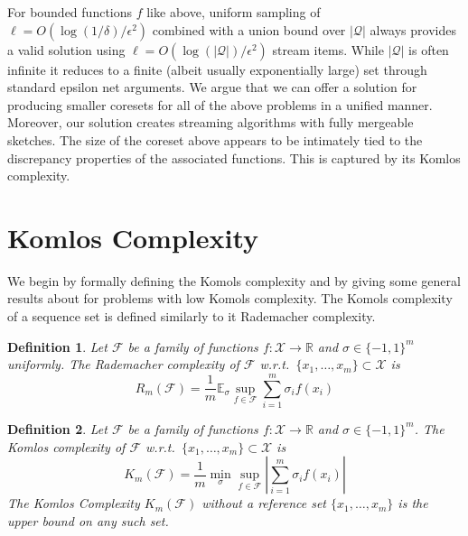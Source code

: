 \documentclass{article} %
\newcommand{\R}{\mathbb{R}}
\newcommand{\E}{\mathbb{E}}
\newcommand{\eps}{\epsilon}
\newcommand{\F}{\mathcal{F}}
\newcommand{\X}{\mathcal{X}}
\newtheorem{definition}{Definition}
\begin{document}
For bounded functions $f$ like above, uniform sampling of $\ell = O(\log(1/\delta)/\eps^2)$ combined with a union bound over $|\mathcal Q|$ always provides a valid solution using $\ell = O(\log(|\mathcal Q|)/\eps^2)$ stream items. 
While $|\mathcal Q|$ is often infinite it reduces to a finite (albeit usually exponentially large) set through standard epsilon net arguments. 
We argue that we can offer a solution for producing smaller coresets for all of the above problems in a unified manner. 
Moreover, our solution creates streaming algorithms with fully mergeable sketches. 
The size of the coreset above appears to be intimately tied to the discrepancy properties of the associated functions.
This is captured by its Komlos complexity.  


\section{Komlos Complexity}
We begin by formally defining the Komols complexity and by giving some general results about for problems with low Komols complexity. The Komols complexity of a sequence set is defined similarly to it Rademacher complexity.
%

\begin{definition}
Let $\F$ be a family of functions $f:\X\rightarrow\R$ and $\sigma \in \{-1,1\}^m$ uniformly. 
The Rademacher complexity of $\F$ w.r.t.\ $\{x_1,\ldots,x_m\} \subset \X$ is 
\[
R_m(\F) =  \frac{1}{m}\E_{\sigma} \sup_{f \in \F}  \sum_{i=1}^{m}\sigma_i f(x_i)
\]
\end{definition}
%
\begin{definition}
Let $\F$ be a family of functions $f:\X\rightarrow\R$ and $\sigma \in \{-1,1\}^m$. 
The Komlos complexity of $\F$ w.r.t.\ $\{x_1,\ldots,x_m\} \subset \X$ is 
\[
K_m(\F) =  \frac{1}{m}\min_{\sigma} \sup_{f \in \F}  \left|\sum_{i=1}^{m}\sigma_i f(x_i)\right|
\]
The Komlos Complexity $K_m(\F)$ without a reference set $\{x_1,\ldots,x_m\}$ is the upper bound on any such set.
\end{definition}
\end{document}
